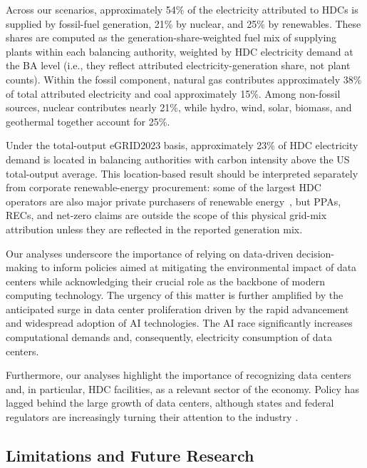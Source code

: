 \documentclass[12pt]{article}
\begin{document}
Across our scenarios, approximately 54\% of the electricity attributed to
HDCs is supplied by fossil-fuel generation, 21\% by nuclear, and 25\% by renewables. These shares are computed as the generation-share-weighted fuel mix of supplying plants within each balancing authority, weighted by HDC electricity demand at the BA level (i.e., they reflect attributed electricity-generation share, not plant counts). Within the fossil component, natural gas contributes approximately 38\% of total attributed electricity
and coal approximately 15\%. Among non-fossil sources, nuclear contributes nearly 21\%, while hydro, wind, solar, biomass, and geothermal together account for 25\%.

Under the total-output eGRID2023 basis, approximately 23\% of HDC electricity demand is located in balancing authorities with carbon intensity above the US total-output average. This location-based result should be interpreted separately from corporate renewable-energy procurement: some of the largest HDC operators are also major private purchasers of renewable energy~\cite{bnef_clean_energy}, but PPAs, RECs, and net-zero claims are outside the scope of this physical grid-mix attribution unless they are reflected in the reported generation mix.

Our analyses underscore the importance of relying on data-driven decision-making to inform policies aimed at mitigating the environmental impact of data centers while acknowledging their crucial role as the backbone of modern computing technology. The urgency of this matter is further amplified by the anticipated surge in data center proliferation driven by the rapid advancement and widespread adoption of AI technologies. The AI race significantly increases computational demands and, consequently, electricity consumption of data centers.

Furthermore, our analyses highlight the importance of recognizing data centers and, in particular, HDC facilities, as a relevant sector of the economy. Policy has lagged behind the large growth of data centers, although states and federal regulators are increasingly turning their attention to the industry \cite{datacenter_knowledge_tougher_reporting, uptimeinstitute_mandates_crypto}.


\subsection*{Limitations and Future Research}
\end{document}

